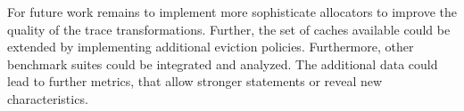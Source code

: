 \documentclass[onecolumn, openright, master, english, signatures]{dbrgrptt}
\begin{document}
For future work remains to implement more sophisticate allocators to improve the quality of the trace transformations.
Further, the set of caches available could be extended by implementing additional eviction policies.
Furthermore, other benchmark suites could be integrated and analyzed.
The additional data could lead to further metrics, that allow stronger statements or
 reveal new characteristics.


\backmatter%

%
\end{document}
